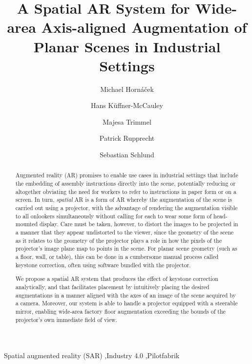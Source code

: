 \documentclass[review]{elsarticle}
\begin{document}
\begin{frontmatter}

\title{A Spatial AR System for Wide-area Axis-aligned Augmentation of Planar Scenes in Industrial Settings} %

\author{Michael Horn\'{a}\v{c}ek}
\author{Hans K\"{u}ffner-McCauley}
\author{Majesa Trimmel}
\author{Patrick Rupprecht}
\author{Sebastian Schlund}
\address{Human Centered Cyber Physical Production and Assembly Systems, Institute for Management Sciences, TU Vienna, Austria}

\begin{abstract}
Augmented reality (AR) promises to enable use cases in industrial settings that include the embedding of assembly instructions directly into the scene, potentially reducing or altogether obviating the need for workers to refer to instructions in paper form or on a screen. In turn, \textit{spatial} AR is a form of AR whereby the augmentation of the scene is carried out using a projector, with the advantage of rendering the augmentation visible to all onlookers simultaneously without calling for each to wear some form of head-mounted display. Care must be taken, however, to distort the images to be projected in a manner that they appear undistorted to the viewer, since the geometry of the scene as it relates to the geometry of the projector plays a role in how the pixels of the projector's image plane map to points in the scene. For planar scene geometry (such as a floor, wall, or table), this can be done in a cumbersome manual process called keystone correction, often using software bundled with the projector.

We propose a spatial AR system that produces the effect of keystone correction analytically, and that facilitates placement by intuitively placing the desired augmentations in a manner aligned with the axes of an image of the scene acquired by a camera. Moreover, our system is able to handle a projector equipped with a steerable mirror, enabling wide-area factory floor augmentation exceeding the bounds of the projector's own immediate field of view.
\end{abstract}

\begin{keyword}
Spatial augmented reality (SAR) \sep Industry 4.0 \sep Pilotfabrik
\end{keyword}

\end{frontmatter}
\end{document}
